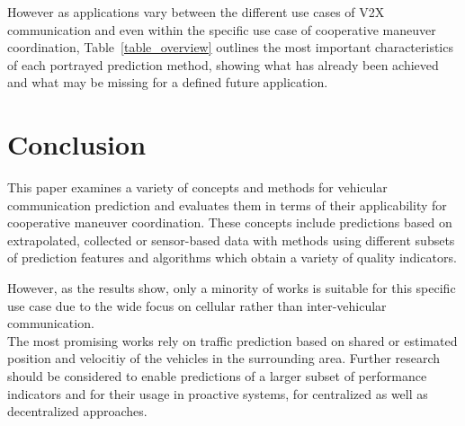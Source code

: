 \documentclass[conference]{IEEEtran}
\begin{document}
However as applications vary between the different use cases of V2X communication and even within the specific use case of cooperative maneuver coordination, Table~\ref{table_overview} outlines the most important characteristics of each portrayed prediction method, showing what has already been achieved and what may be missing for a defined future application.

\section{Conclusion}\label{sec:conclusion}
This paper examines a variety of concepts and methods for vehicular communication prediction and evaluates them in terms of their applicability for cooperative maneuver coordination. These concepts include predictions based on extrapolated, collected or sensor-based data with methods using different subsets of prediction features and algorithms which obtain a variety of quality indicators.

However, as the results show, only a minority of works is suitable for this specific use case due to the wide focus on cellular rather than inter-vehicular communication.\\
The most promising works rely on traffic prediction based on shared or estimated position and velocitiy of the vehicles in the surrounding area. Further research should be considered to enable predictions of a larger subset of performance indicators and for their usage in proactive systems, for centralized as well as decentralized approaches.






\printbibliography
\end{document}
